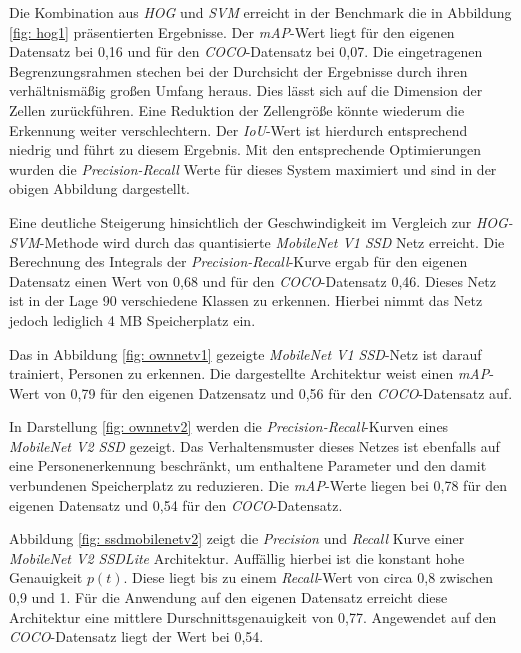 

Die Kombination aus \textit{HOG} und \textit{SVM} erreicht in der Benchmark die in Abbildung \ref{fig: hog1} präsentierten Ergebnisse. Der \textit{mAP}-Wert liegt für den eigenen Datensatz bei 0,16 und für den \textit{COCO}-Datensatz bei 0,07. Die eingetragenen Begrenzungsrahmen stechen bei der Durchsicht der Ergebnisse durch ihren verhältnismäßig großen Umfang heraus. Dies lässt sich auf die Dimension der Zellen zurückführen. Eine Reduktion der Zellengröße könnte wiederum die Erkennung weiter verschlechtern. Der \textit{IoU}-Wert ist hierdurch entsprechend niedrig und führt zu diesem Ergebnis. Mit den entsprechende Optimierungen wurden die \textit{Precision-Recall} Werte für dieses System maximiert und sind in der obigen Abbildung dargestellt.




Eine deutliche Steigerung hinsichtlich der Geschwindigkeit im Vergleich zur \textit{HOG-SVM}-Methode wird durch das quantisierte \textit{MobileNet V1 SSD} Netz erreicht. Die Berechnung des Integrals der \textit{Precision-Recall}-Kurve ergab für den eigenen Datensatz einen Wert von 0,68 und für den \textit{COCO}-Datensatz 0,46. Dieses Netz ist in der Lage 90 verschiedene Klassen zu erkennen. Hierbei nimmt das Netz jedoch lediglich 4 MB Speicherplatz ein.



Das in Abbildung \ref{fig: ownnetv1} gezeigte \textit{MobileNet V1 SSD}-Netz ist darauf trainiert, Personen zu erkennen. Die dargestellte Architektur weist einen \textit{mAP}-Wert von 0,79 für den eigenen Datzensatz und 0,56 für den \textit{COCO}-Datensatz auf.



In Darstellung \ref{fig: ownnetv2} werden die \textit{Precision-Recall}-Kurven eines \textit{MobileNet V2 SSD} gezeigt. Das Verhaltensmuster dieses Netzes ist ebenfalls auf eine Personenerkennung beschränkt, um enthaltene Parameter und den damit verbundenen Speicherplatz zu reduzieren. Die \textit{mAP}-Werte liegen bei 0,78 für den eigenen Datensatz und 0,54 für den \textit{COCO}-Datensatz. 



Abbildung \ref{fig: ssdmobilenetv2} zeigt die \textit{Precision} und \textit{Recall} Kurve einer \textit{MobileNet V2 SSDLite} Architektur. Auffällig hierbei ist die konstant hohe Genauigkeit $p(t)$. Diese liegt bis zu einem \textit{Recall}-Wert von circa 0,8 zwischen 0,9 und 1. Für die Anwendung auf den eigenen Datensatz erreicht diese Architektur eine mittlere Durschnittsgenauigkeit von 0,77. Angewendet auf den \textit{COCO}-Datensatz liegt der Wert bei 0,54. 

